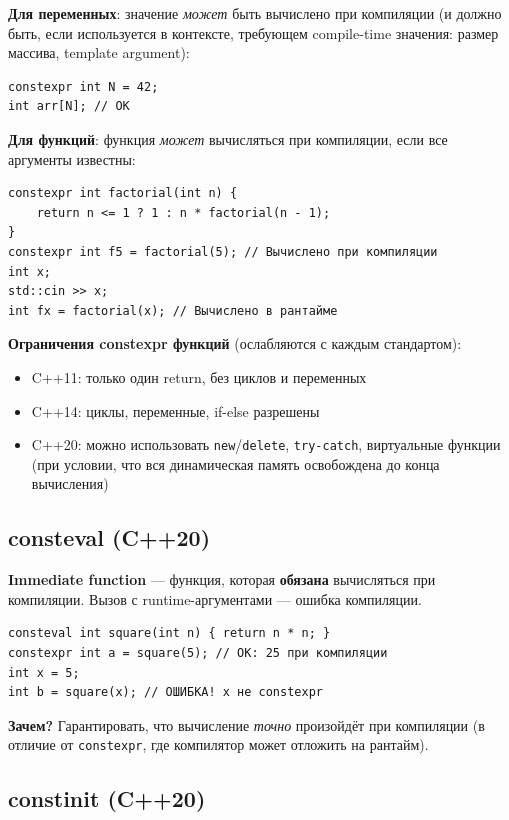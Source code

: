 \documentclass[12pt,a4paper]{article}
\begin{document}
\textbf{Для переменных}: значение \textit{может} быть вычислено при компиляции (и должно быть, если используется в контексте, требующем compile-time значения: размер массива, template argument):
\begin{lstlisting}
constexpr int N = 42;
int arr[N]; // OK
\end{lstlisting}

\textbf{Для функций}: функция \textit{может} вычисляться при компиляции, если все аргументы известны:
\begin{lstlisting}
constexpr int factorial(int n) {
    return n <= 1 ? 1 : n * factorial(n - 1);
}
constexpr int f5 = factorial(5); // Вычислено при компиляции
int x;
std::cin >> x;
int fx = factorial(x); // Вычислено в рантайме
\end{lstlisting}

\textbf{Ограничения constexpr функций} (ослабляются с каждым стандартом):
\begin{itemize}
    \item C++11: только один return, без циклов и переменных
    \item C++14: циклы, переменные, if-else разрешены
    \item C++20: можно использовать \texttt{new}/\texttt{delete}, \texttt{try-catch}, виртуальные функции (при условии, что вся динамическая память освобождена до конца вычисления)
\end{itemize}

\subsection{consteval (C++20)}

\textbf{Immediate function} --- функция, которая \textbf{обязана} вычисляться при компиляции. Вызов с runtime-аргументами --- ошибка компиляции.
\begin{lstlisting}
consteval int square(int n) { return n * n; }
constexpr int a = square(5); // OK: 25 при компиляции
int x = 5;
int b = square(x); // ОШИБКА! x не constexpr
\end{lstlisting}

\textbf{Зачем?} Гарантировать, что вычисление \textit{точно} произойдёт при компиляции (в отличие от \texttt{constexpr}, где компилятор может отложить на рантайм).

\subsection{constinit (C++20)}
\end{document}
